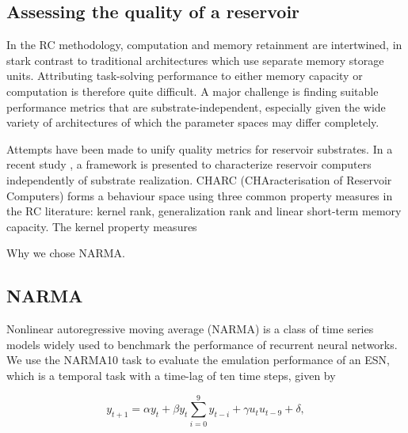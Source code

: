 


\subsection{Assessing the quality of a reservoir}

In the RC methodology, computation and memory retainment are intertwined, in
stark contrast to traditional architectures which use separate memory storage
units. Attributing task-solving performance to either memory capacity or
computation is therefore quite difficult. A major challenge is finding suitable
performance metrics that are substrate-independent, especially given the wide
variety of architectures of which the parameter spaces may differ completely.

Attempts have been made to unify quality metrics for reservoir substrates. In a
recent study \cite{dale_substrate-independent_2019}, a framework is presented to
characterize reservoir computers independently of substrate realization. CHARC
(CHAracterisation of Reservoir Computers) forms a behaviour space using three
common property measures in the RC literature: kernel rank, generalization rank
and linear short-term memory capacity. The kernel property measures \cite{legenstein_edge_2007}

Why we chose NARMA.


\subsection{NARMA}

Nonlinear autoregressive moving average (NARMA) \cite{atiya_new_2000} is a class
of time series models widely used to benchmark the performance of recurrent
neural networks. We use the NARMA10 task to evaluate the emulation performance
of an ESN, which is a temporal task with a time-lag of ten time steps, given by


\begin{equation}
  y_{t+1} = \alpha y_{t} +
  \beta y_{t} \sum_{i=0}^{9}y_{t-i} +
  \gamma u_{t}u_{t-9} +
  \delta,
  \label{narma}
\end{equation}

